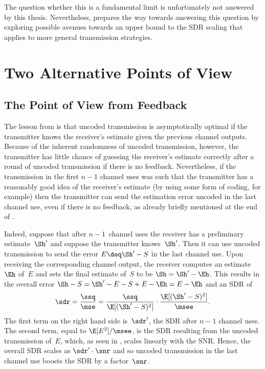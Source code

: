 The question whether this is a fundamental limit is unfortunately not answered
by this thesis.  Nevertheless,  prepares the way towards
answering this question by exploring possible avenues towards an upper bound to
the SDR scaling that applies to more general transmission strategies. 


\section{Two Alternative Points of View}\label{sec:twoperspectives}

\subsection{The Point of View from Feedback}

The lesson from  is that uncoded transmission is asymptotically
optimal if the transmitter knows the receiver's estimate given the previous
channel outputs.  Because of the inherent randomness of uncoded transmission,
however, the transmitter has little chance of guessing the receiver's estimate
correctly after a round of uncoded transmission if there is no feedback.
Nevertheless, if the transmission in the first $n-1$ channel uses was such that
the transmitter has a reasonably good idea of the receiver's estimate (by using
some form of coding, for example) then the transmitter can send the estimation
error uncoded in the last channel use, even if there is no feedback, as already
briefly mentioned at the end of . 

Indeed, suppose that after $n-1$~channel uses the receiver has a preliminary
estimate~$\Sh'$ and suppose the transmitter knows~$\Sh'$. Then it 
can use uncoded transmission to send the error $E \deq \Sh' - S$ in the last
channel use. Upon receiving the corresponding channel output, the receiver
computes an estimate $\Eh$ of~$E$ and sets the final estimate of~$S$ to be $\Sh
= \Sh' - \Eh$. This results in the overall error $\Sh - S = \Sh' - E - S + E -
\Eh = E - \Eh$ and an SDR of
\begin{equation*}
  \sdr = \frac{\ssq}{\mse} = \frac{\ssq}{\E[(\Sh' - S)^2]} \cdot
  \frac{\E[(\Sh' - S)^2]}{\msee}.
\end{equation*}
The first term on the right hand side is~$\sdr'$, the SDR after $n-1$ channel
uses. The second term, equal to $\E[E^2]/\msee$, is the SDR resulting from the
uncoded transmission of~$E$, which, as seen in , scales
linearly with the SNR. Hence, the overall SDR scales as $\sdr' \cdot \snr$ and
so uncoded transmission in the last channel use boosts the SDR by a
factor~$\snr$. 

